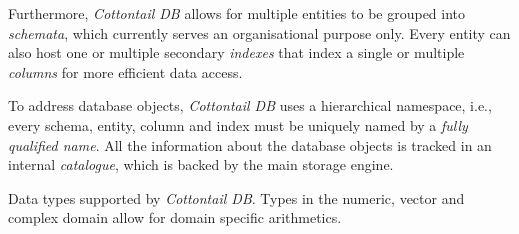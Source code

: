 Furthermore, \emph{Cottontail DB} allows for multiple entities to be grouped into \emph{schemata}, which currently serves an organisational purpose only. Every entity can also host one or multiple secondary \emph{indexes} that index a single or multiple \emph{columns} for more efficient data access.

To address database objects, \emph{Cottontail DB} uses a hierarchical namespace, i.e., every schema, entity, column and index must be uniquely named by a \emph{fully qualified name}. All the information about the database objects is tracked in an internal \emph{catalogue}, which is backed by the main storage engine.

\begin{table}

    \caption{Data types supported by \emph{Cottontail DB}. Types in the numeric, vector and complex domain allow for domain specific arithmetics.}
    \label{table:cottontail_types}


\end{table}
